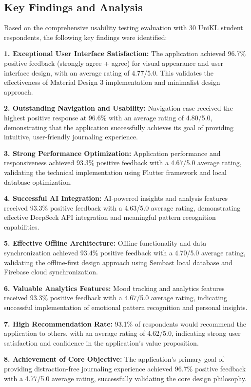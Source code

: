 \subsection{Key Findings and Analysis}\label{sec:keyFindings}

Based on the comprehensive usability testing evaluation with 30 UniKL student respondents, the following key findings were identified:

\textbf{1. Exceptional User Interface Satisfaction:} The application achieved 96.7\% positive feedback (strongly agree + agree) for visual appearance and user interface design, with an average rating of 4.77/5.0. This validates the effectiveness of Material Design 3 implementation and minimalist design approach.

\textbf{2. Outstanding Navigation and Usability:} Navigation ease received the highest positive response at 96.6\% with an average rating of 4.80/5.0, demonstrating that the application successfully achieves its goal of providing intuitive, user-friendly journaling experience.

\textbf{3. Strong Performance Optimization:} Application performance and responsiveness achieved 93.3\% positive feedback with a 4.67/5.0 average rating, validating the technical implementation using Flutter framework and local database optimization.

\textbf{4. Successful AI Integration:} AI-powered insights and analysis features received 93.3\% positive feedback with a 4.63/5.0 average rating, demonstrating effective DeepSeek API integration and meaningful pattern recognition capabilities.

\textbf{5. Effective Offline Architecture:} Offline functionality and data synchronization achieved 93.4\% positive feedback with a 4.70/5.0 average rating, validating the offline-first design approach using Sembast local database and Firebase cloud synchronization.

\textbf{6. Valuable Analytics Features:} Mood tracking and analytics features received 93.3\% positive feedback with a 4.67/5.0 average rating, indicating successful implementation of emotional pattern recognition and personal insights.

\textbf{7. High Recommendation Rate:} 93.1\% of respondents would recommend the application to others, with an average rating of 4.62/5.0, indicating strong user satisfaction and confidence in the application's value proposition.

\textbf{8. Achievement of Core Objective:} The application's primary goal of providing distraction-free journaling experience achieved 96.7\% positive feedback with a 4.77/5.0 average rating, successfully validating the core design philosophy.

